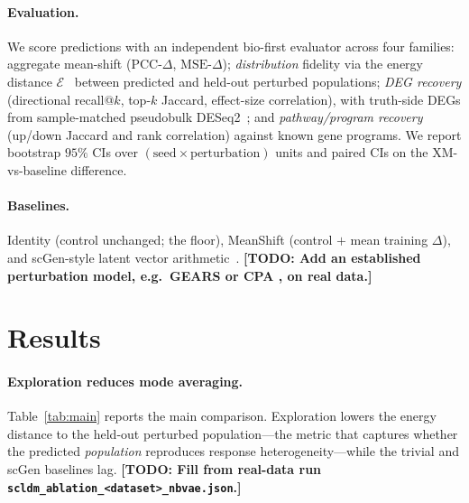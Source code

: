 \documentclass{article}
\newcommand{\TODO}[1]{{\color{red}\textbf{[TODO: #1]}}}
\newcommand{\Ed}{\mathcal{E}} %
\begin{document}
\paragraph{Evaluation.}
We score predictions with an independent bio-first evaluator across four
families: aggregate mean-shift ($\text{PCC-}\Delta$, $\text{MSE-}\Delta$);
\emph{distribution} fidelity via the energy distance $\Ed$~\citep{energydist}
between predicted and held-out perturbed populations; \emph{DEG recovery}
(directional recall@$k$, top-$k$ Jaccard, effect-size correlation), with
truth-side DEGs from sample-matched pseudobulk DESeq2~\citep{deseq2}; and
\emph{pathway/program recovery} (up/down Jaccard and rank correlation) against
known gene programs. We report bootstrap $95\%$ CIs over
$(\text{seed}\times\text{perturbation})$ units and paired CIs on the
XM-vs-baseline difference.

\paragraph{Baselines.}
Identity (control unchanged; the floor), MeanShift (control $+$ mean training
$\Delta$), and scGen-style latent vector arithmetic~\citep{scgen}. \TODO{Add an
established perturbation model, e.g.\ GEARS \citep{gears} or CPA
\citep{cpa}, on real data.}

\section{Results}
\label{sec:results}

\paragraph{Exploration reduces mode averaging.}
Table~\ref{tab:main} reports the main comparison. Exploration lowers the energy
distance to the held-out perturbed population---the metric that captures whether
the predicted \emph{population} reproduces response heterogeneity---while the
trivial and scGen baselines lag. \TODO{Fill from real-data run
\texttt{scldm\_ablation\_<dataset>\_nbvae.json}.}
\end{document}
